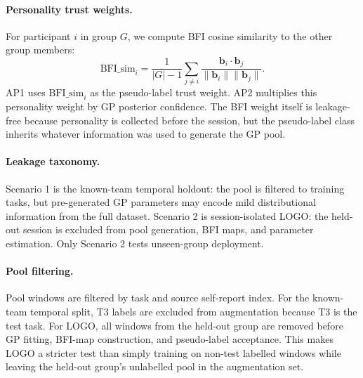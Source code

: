 \documentclass[sigconf,review,anonymous]{acmart}
\begin{document}
\paragraph{Personality trust weights.}
For participant $i$ in group $G$, we compute BFI cosine similarity to the
other group members:
\begin{equation}
  \mathrm{BFI\_sim}_i =
  \frac{1}{|G|-1}\sum_{j \neq i}
  \frac{\mathbf{b}_i \cdot \mathbf{b}_j}{\|\mathbf{b}_i\|\|\mathbf{b}_j\|}.
\end{equation}
AP1 uses $\mathrm{BFI\_sim}_i$ as the pseudo-label trust weight.
AP2 multiplies this personality weight by GP posterior confidence.
The BFI weight itself is leakage-free because personality is collected before
the session, but the pseudo-label class inherits whatever information was used
to generate the GP pool.

\paragraph{Leakage taxonomy.}
Scenario 1 is the known-team temporal holdout: the pool is filtered to
training tasks, but pre-generated GP parameters may encode mild distributional
information from the full dataset.
Scenario 2 is session-isolated LOGO: the held-out session is excluded from
pool generation, BFI maps, and parameter estimation.
Only Scenario 2 tests unseen-group deployment.

\paragraph{Pool filtering.}
Pool windows are filtered by task and source self-report index.
For the known-team temporal split, T3 labels are excluded from augmentation
because T3 is the test task.
For LOGO, all windows from the held-out group are removed before GP fitting,
BFI-map construction, and pseudo-label acceptance.
This makes LOGO a stricter test than simply training on non-test labelled
windows while leaving the held-out group's unlabelled pool in the augmentation
set.
\end{document}
